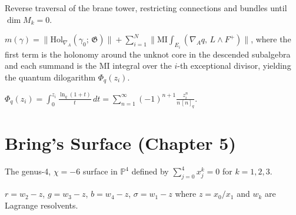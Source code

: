 \begin{definition}[Descent]
  \label{def:descent}
  Reverse traversal of the brane tower, restricting connections
  and bundles until $\dim M_k = 0$.
\end{definition}

\begin{theorem}
  \label{thm:topological-mass-ch4}
  \leanok
  $m(\gamma) = \lVert\mathrm{Hol}_{\nabla_A}(\gamma_0;\,\mathfrak{G})\rVert
  + \sum_{i=1}^N \lVert\mathrm{MI}\!\int_{E_i}(\nabla_A q,\,L \wedge F^+)\rVert$,
  where the first term is the holonomy around the unknot core in the
  descended subalgebra and each summand is the MI integral over the
  $i$-th exceptional divisor, yielding the quantum dilogarithm
  $\Phi_q(z_i)$.
\end{theorem}

\begin{corollary}
  \label{cor:quantum-dilogarithm}
  $\Phi_q(z_i) = \int_0^{z_i} \frac{\ln_q(1+t)}{t}\,dt
  = \sum_{n=1}^\infty (-1)^{n+1} \frac{z_i^n}{n\,[n]_q}$.
\end{corollary}


\chapter{Bring's Surface (Chapter 5)}

\begin{definition}
  \label{def:brings-surface-ch5}
  The genus-4, $\chi=-6$ surface in $\mathbb{P}^4$ defined by
  $\sum_{j=0}^4 x_j^k = 0$ for $k=1,2,3$.
\end{definition}

\begin{definition}
  \label{def:color-tube-coordinates}
  $r = w_2 - z$, $g = w_3 - z$, $b = w_4 - z$, $\sigma = w_1 - z$
  where $z = x_0/x_1$ and $w_k$ are Lagrange resolvents.
\end{definition}

